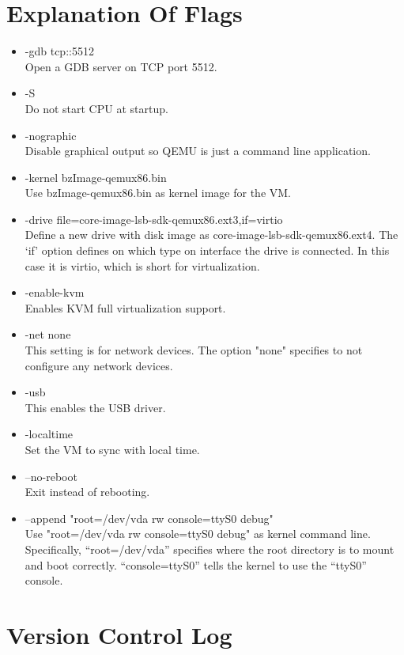 \documentclass[english,10pt,letterpaper,onecolumn]{IEEEtran}
\begin{document}
  \newpage
  \section{Explanation Of Flags}
  
  \begin{itemize}
  \item -gdb tcp::5512 \\
  Open a GDB server on TCP port 5512.
  \item -S \\
  Do not start CPU at startup.
  \item -nographic \\
  Disable graphical output so QEMU is just a command line application.
  \item -kernel bzImage-qemux86.bin \\
  Use bzImage-qemux86.bin as kernel image for the VM.
  \item -drive file=core-image-lsb-sdk-qemux86.ext3,if=virtio \\
  Define a new drive with disk image as core-image-lsb-sdk-qemux86.ext4. The ‘if’ option defines on which type on interface the drive is connected. In this case it is virtio, which is short for virtualization.
  \item -enable-kvm \\
  Enables KVM full virtualization support.
  \item -net none \\
  This setting is for network devices. The option "none" specifies to not configure any network devices.
  \item -usb \\ 
  This enables the USB driver.
  \item -localtime \\ 
  Set the VM to sync with local time.
  \item --no-reboot \\
  Exit instead of rebooting.
  \item --append "root=/dev/vda rw console=ttyS0 debug" \\
  Use "root=/dev/vda rw console=ttyS0 debug" as kernel command line. Specifically, “root=/dev/vda” specifies where the root directory is to mount and boot correctly. “console=ttyS0” tells the kernel to use the “ttyS0” console.
  \end{itemize}
  
  \newpage
  \section{Version Control Log}
  
\end{document}
